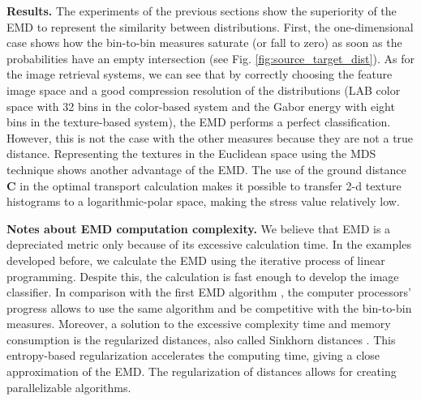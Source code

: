 \textbf{Results.}
The experiments of the previous sections show the superiority of the EMD to represent the similarity between distributions. First, the one-dimensional case shows how the bin-to-bin measures saturate (or fall to zero) as soon as the probabilities have an empty intersection (see Fig. \ref{fig:source_target_dist}). As for the image retrieval systems, we can see that by correctly choosing the feature image space and a good compression resolution of the distributions (LAB color space with 32 bins in the color-based system and the Gabor energy with eight bins in the texture-based system), the EMD performs a perfect classification. However, this is not the case with the other measures because they are not a true distance. Representing the textures in the Euclidean space using the MDS technique shows another advantage of the EMD. The use of the ground distance $\textbf{C}$ in the optimal transport calculation makes it possible to transfer 2-d texture histograms to a logarithmic-polar space, making the stress value relatively low. 


\textbf{Notes about EMD computation complexity.}
We believe that EMD is a depreciated metric only because of its excessive calculation time. In the examples developed before, we calculate the EMD using the iterative process of linear programming. Despite this, the calculation is fast enough to develop the image classifier. In comparison with the first EMD algorithm \citep{Rubner.Tomasi.ea:IJCV:2000}, the computer processors' progress allows to use the same algorithm and be competitive with the bin-to-bin measures.
Moreover, a solution to the excessive complexity time and memory consumption is the regularized distances, also called Sinkhorn distances \citep{Cuturi:NIPS:2013}. This entropy-based regularization accelerates the computing time, giving a close approximation of the EMD. The regularization of distances allows for creating parallelizable algorithms.
